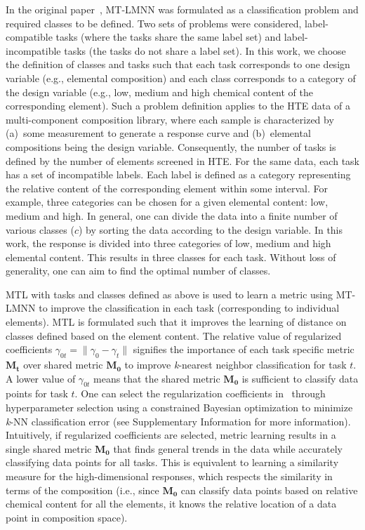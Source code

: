 In the original paper~\cite{parameswaran2010large}, MT-LMNN was formulated as a classification problem and required classes to be defined. 
Two sets of problems were considered, label-compatible tasks (where the tasks share the same label set) and label-incompatible tasks (the tasks do not share a label set). 
In this work, we choose the definition of classes and tasks such that each task corresponds to one design variable (e.g., elemental composition) and each class corresponds to a category of the design variable (e.g., low, medium and high chemical content of the corresponding element). 
Such a problem definition applies to the HTE data of a multi-component composition library, where each sample is characterized by (a)~some measurement to generate a response curve and (b)~elemental compositions being the design variable. 
Consequently, the number of tasks is defined by the number of elements screened in HTE.
For the same data, each task has a set of incompatible labels.
Each label is defined as a category representing the relative content of the corresponding element within some interval.
For example, three categories can be chosen for a given elemental content: low, medium and high. 
In general, one can divide the data into a finite number of various classes ($c$) by sorting the data according to the design variable. In this work, the response is divided into three categories of low, medium and high elemental content. This results in three classes for each task. Without loss of generality, one can aim to find the optimal number of classes. 

MTL with tasks and classes defined as above is used to learn a metric using MT-LMNN to improve the classification in each task (corresponding to individual elements). 
MTL is formulated such that it improves the learning of distance on classes defined based on the element content. 
The relative value of regularized coefficients $ \gamma_{0t} = \lVert \gamma_0 -\gamma_t \rVert$ signifies the importance of each task specific metric \(\mathbf{M_t}\) over shared metric \(\mathbf{M_0}\) to improve \textit{k}-nearest neighbor classification for task $t$. 
A lower value of $\gamma_{0t}$ means that the shared metric \(\mathbf{M_0}\) is sufficient to classify data points for task $t$.  
One can select the regularization coefficients in~ through hyperparameter selection using a constrained Bayesian optimization to minimize \textit{k}-NN classification error (see Supplementary Information for more information). 
Intuitively, if regularized coefficients are selected, metric learning results in a single shared metric \(\mathbf{M_0}\) that finds general trends in the data while accurately classifying data points for all tasks. 
This is equivalent to learning a similarity measure for the high-dimensional responses, which respects the similarity in terms of the composition (i.e., since \(\mathbf{M_0}\) can classify data points based on relative chemical content for all the elements, it knows the relative location of a data point in composition space).   

